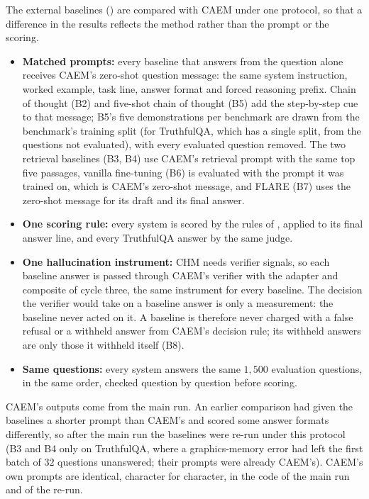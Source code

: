 The external baselines () are compared with CAEM under one protocol, so that a difference in the results reflects the method rather than the prompt or the scoring.
\begin{itemize}
    \item \textbf{Matched prompts:} every baseline that answers from the question alone receives CAEM's zero-shot question message: the same system instruction, worked example, task line, answer format and forced reasoning prefix. Chain of thought (B2) and five-shot chain of thought (B5) add the step-by-step cue to that message; B5's five demonstrations per benchmark are drawn from the benchmark's training split (for TruthfulQA, which has a single split, from the questions not evaluated), with every evaluated question removed. The two retrieval baselines (B3, B4) use CAEM's retrieval prompt with the same top five passages, vanilla fine-tuning (B6) is evaluated with the prompt it was trained on, which is CAEM's zero-shot message, and FLARE (B7) uses the zero-shot message for its draft and its final answer.
    \item \textbf{One scoring rule:} every system is scored by the rules of , applied to its final answer line, and every TruthfulQA answer by the same judge.
    \item \textbf{One hallucination instrument:} CHM needs verifier signals, so each baseline answer is passed through CAEM's verifier with the adapter and composite of cycle three, the same instrument for every baseline. The decision the verifier would take on a baseline answer is only a measurement: the baseline never acted on it. A baseline is therefore never charged with a false refusal or a withheld answer from CAEM's decision rule; its withheld answers are only those it withheld itself (B8).
    \item \textbf{Same questions:} every system answers the same $1{,}500$ evaluation questions, in the same order, checked question by question before scoring.
\end{itemize}
CAEM's outputs come from the main run. An earlier comparison had given the baselines a shorter prompt than CAEM's and scored some answer formats differently, so after the main run the baselines were re-run under this protocol (B3 and B4 only on TruthfulQA, where a graphics-memory error had left the first batch of $32$ questions unanswered; their prompts were already CAEM's). CAEM's own prompts are identical, character for character, in the code of the main run and of the re-run.

